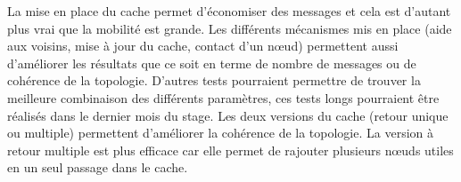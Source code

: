 La mise en place du cache permet d'économiser des messages et cela est d'autant plus vrai que la mobilité est grande. Les différents mécanismes mis en place (aide aux voisins, mise à jour du cache, contact d'un nœud) permettent aussi d'améliorer les résultats que ce soit en terme de nombre de messages ou de cohérence de la topologie. D'autres tests pourraient permettre de trouver la meilleure combinaison des différents paramètres, ces tests longs pourraient être réalisés dans le dernier mois du stage. Les deux versions du cache (retour unique ou multiple) permettent d'améliorer la cohérence de la topologie. La version à retour multiple est plus efficace car elle permet de rajouter plusieurs nœuds utiles en un seul passage dans le cache.
 
